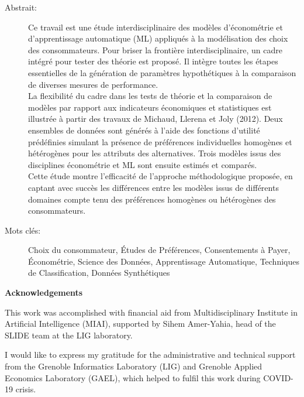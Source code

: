 \documentclass[12pt,]{article}
\begin{document}
\begin{description}
\item[Abstrait:] Ce travail est une étude interdisciplinaire des modèles d'économétrie et d'apprentissage automatique (ML) appliqués à la modélisation des choix des consommateurs.
Pour briser la frontière interdisciplinaire, un cadre intégré pour tester des théorie est proposé.
Il intègre toutes les étapes essentielles de la génération de paramètres hypothétiques à la comparaison de diverses mesures de performance. \vspace{0.1cm}\\ 
La flexibilité du cadre dans les tests de théorie et la comparaison de modèles par rapport aux indicateurs économiques et statistiques est illustrée à partir des travaux de Michaud, Llerena et Joly (2012).
Deux ensembles de données sont générés à l'aide des fonctions d'utilité prédéfinies simulant la présence de préférences individuelles homogènes et hétérogènes pour les attributs des alternatives.
Trois modèles issus des disciplines économétrie et ML sont ensuite estimés et comparés. \vspace{0.1cm}\\ 
Cette étude montre l'efficacité de l'approche méthodologique proposée, en captant avec succès les différences entre les modèles issus de différents domaines compte tenu des préférences homogènes ou hétérogènes des consommateurs.

\item[Mots clés:] Choix du consommateur, \'Etudes de Préférences, Consentements à Payer, \'Econométrie, Science des Données, Apprentissage Automatique, Techniques de Classification, Données Synthétiques

\end{description}

\newpage

\begin{center}
\textbf{\Large Acknowledgements}
\end{center}
\vspace{2.3ex}

This work was accomplished with financial aid from Multidisciplinary
Institute in Artificial Intelligence (MIAI), supported by Sihem
Amer-Yahia, head of the SLIDE team at the LIG laboratory.

\vspace{10mm}

I would like to express my gratitude for the administrative and
technical support from the Grenoble Informatics Laboratory (LIG) and
Grenoble Applied Economics Laboratory (GAEL), which helped to fulfil
this work during COVID-19 crisis.
\end{document}
